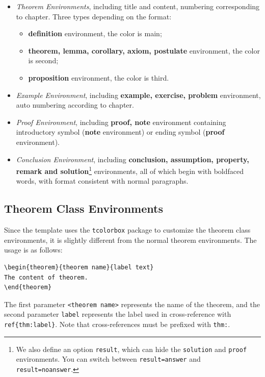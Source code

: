 \documentclass[11pt]{elegantbook}
\begin{document}
\begin{itemize}
\item \textit{Theorem Environments}, including title and content, numbering corresponding to chapter. Three types depending on the format:
   \begin{itemize}
      \item \textcolor{main}{\textbf{definition}} environment, the color is  \textcolor{main}{main};
      \item \textcolor{second}{\textbf{theorem, lemma, corollary, axiom, postulate}} environment, the color is \textcolor{second} {second};
      \item \textcolor{third}{\textbf{proposition}} environment, the color is \textcolor{third}{third}.
   \end{itemize}
\item \textit{Example Environment}, including \textbf{example, exercise, problem} environment, auto numbering according to chapter.
\item \textit{Proof Environment}, including \textbf{proof, note} environment containing introductory symbol (\textbf{note} environment) or ending symbol (\textbf{proof} environment).
\item \textit{Conclusion Environment}, including \textbf{conclusion, assumption, property, remark and solution}\footnote{We also define an option \lstinline{result}, which can hide the \lstinline{solution} and \lstinline{proof} environments. You can switch between \lstinline{result=answer} and \lstinline{result=noanswer}.} environments, all of which begin with boldfaced words, with format consistent with normal paragraphs.
\end{itemize}

\subsection{Theorem Class Environments}
Since the template uses the \lstinline{tcolorbox} package to customize the theorem class environments, it is slightly different from the normal theorem environments. The usage is as follows:
\begin{lstlisting}
\begin{theorem}{theorem name}{label text}
The content of theorem.
\end{theorem}
\end{lstlisting}

The first parameter \lstinline{<theorem name>} represents the name of the theorem, and the second parameter \lstinline{label} represents the label used in cross-reference with \verb|ref{thm:label}|. Note that cross-references must be prefixed with \lstinline{thm:}. 
\end{document}
